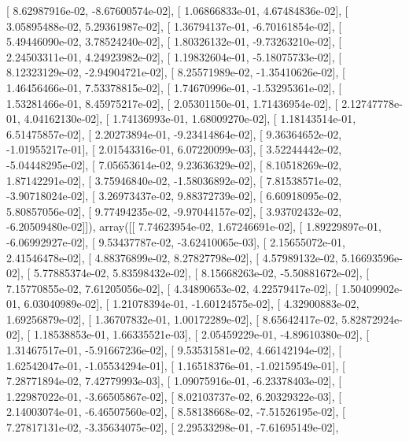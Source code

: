 \documentclass{article}
\begin{document}
       [  8.62987916e-02,  -8.67600574e-02],
       [  1.06866833e-01,   4.67484836e-02],
       [  3.05895488e-02,   5.29361987e-02],
       [  1.36794137e-01,  -6.70161854e-02],
       [  5.49446090e-02,   3.78524240e-02],
       [  1.80326132e-01,  -9.73263210e-02],
       [  2.24503311e-01,   4.24923982e-02],
       [  1.19832604e-01,  -5.18075733e-02],
       [  8.12323129e-02,  -2.94904721e-02],
       [  8.25571989e-02,  -1.35410626e-02],
       [  1.46456466e-01,   7.53378815e-02],
       [  1.74670996e-01,  -1.53295361e-02],
       [  1.53281466e-01,   8.45975217e-02],
       [  2.05301150e-01,   1.71436954e-02],
       [  2.12747778e-01,   4.04162130e-02],
       [  1.74136993e-01,   1.68009270e-02],
       [  1.18143514e-01,   6.51475857e-02],
       [  2.20273894e-01,  -9.23414864e-02],
       [  9.36364652e-02,  -1.01955217e-01],
       [  2.01543316e-01,   6.07220099e-03],
       [  3.52244442e-02,  -5.04448295e-02],
       [  7.05653614e-02,   9.23636329e-02],
       [  8.10518269e-02,   1.87142291e-02],
       [  3.75946840e-02,  -1.58036892e-02],
       [  7.81538571e-02,  -3.90718024e-02],
       [  3.26973437e-02,   9.88372739e-02],
       [  6.60918095e-02,   5.80857056e-02],
       [  9.77494235e-02,  -9.97044157e-02],
       [  3.93702432e-02,  -6.20509480e-02]]), array([[  7.74623954e-02,   1.67246691e-02],
       [  1.89229897e-01,  -6.06992927e-02],
       [  9.53437787e-02,  -3.62410065e-03],
       [  2.15655072e-01,   2.41546478e-02],
       [  4.88376899e-02,   8.27827798e-02],
       [  4.57989132e-02,   5.16693596e-02],
       [  5.77885374e-02,   5.83598432e-02],
       [  8.15668263e-02,  -5.50881672e-02],
       [  7.15770855e-02,   7.61205056e-02],
       [  4.34890653e-02,   4.22579417e-02],
       [  1.50409902e-01,   6.03040989e-02],
       [  1.21078394e-01,  -1.60124575e-02],
       [  4.32900883e-02,   1.69256879e-02],
       [  1.36707832e-01,   1.00172289e-02],
       [  8.65642417e-02,   5.82872924e-02],
       [  1.18538853e-01,   1.66335521e-03],
       [  2.05459229e-01,  -4.89610380e-02],
       [  1.31467517e-01,  -5.91667236e-02],
       [  9.53531581e-02,   4.66142194e-02],
       [  1.62542047e-01,  -1.05534294e-01],
       [  1.16518376e-01,  -1.02159549e-01],
       [  7.28771894e-02,   7.42779993e-03],
       [  1.09075916e-01,  -6.23378403e-02],
       [  1.22987022e-01,  -3.66505867e-02],
       [  8.02103737e-02,   6.20329322e-03],
       [  2.14003074e-01,  -6.46507560e-02],
       [  8.58138668e-02,  -7.51526195e-02],
       [  7.27817131e-02,  -3.35634075e-02],
       [  2.29533298e-01,  -7.61695149e-02],
\end{document}
